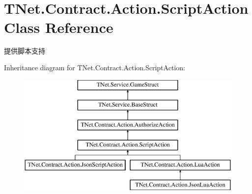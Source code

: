 \hypertarget{class_t_net_1_1_contract_1_1_action_1_1_script_action}{}\section{T\+Net.\+Contract.\+Action.\+Script\+Action Class Reference}
\label{class_t_net_1_1_contract_1_1_action_1_1_script_action}


提供脚本支持  


Inheritance diagram for T\+Net.\+Contract.\+Action.\+Script\+Action\+:\begin{figure}[H]
\begin{center}
\leavevmode
\includegraphics[height=6.000000cm]{class_t_net_1_1_contract_1_1_action_1_1_script_action}
\end{center}
\end{figure}
